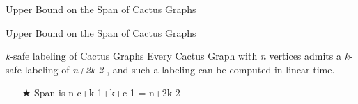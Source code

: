 \documentclass{beamer}
\begin{document}
\begin{frame}{Upper Bound on the Span of Cactus Graphs }
\begin{center}
									\end{center}	
									
								\end{frame}
								\begin{frame}{Upper Bound on the Span of Cactus Graphs }
									\begin{block}{\textit{k}-safe labeling of Cactus Graphs }
										Every Cactus Graph with \textit{n} vertices admits a \textit{k}-safe labeling of
										\textit{n+2k-2} , and such a
										labeling can be computed in linear time.
									\end{block}
									\begin{itemize}
										\item[]
										\item[]
										\item[$\bigstar$] \Large{ Span is \textcolor{ao(english)}{n-c+k-1+k+c-1} = \textcolor{ao(english)}{n+2k-2}}
									\end{itemize}
									
								\end{frame}
								
\end{document}
